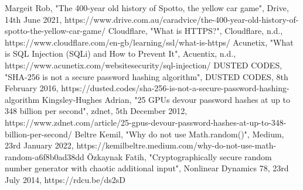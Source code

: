 \documentclass[]{final_report}
\begin{document}
\newpage
\begin{thebibliography}{99}
 Margeit Rob, "The 400-year old history of Spotto, the yellow car game", Drive, 14th June 2021, https://www.drive.com.au/caradvice/the-400-year-old-history-of-spotto-the-yellow-car-game/ 
 Cloudflare, "What is HTTPS?", Cloudflare, n.d., https://www.cloudflare.com/en-gb/learning/ssl/what-is-https/
 Acunetix, "What is SQL Injection (SQLi) and How to Prevent It", Acuentix, n.d., https://www.acunetix.com/websitesecurity/sql-injection/
 DUSTED CODES, "SHA-256 is not a secure password hashing algorithm", DUSTED CODES, 8th February 2016, https://dusted.codes/sha-256-is-not-a-secure-password-hashing-algorithm
 Kingsley-Hughes Adrian, "25 GPUs devour password hashes at up to 348 billion per second", zdnet, 5th December 2012, https://www.zdnet.com/article/25-gpus-devour-password-hashes-at-up-to-348-billion-per-second/
 Beltre Kemil, "Why do not use Math.random()", Medium, 23rd January 2022, https://kemilbeltre.medium.com/why-do-not-use-math-random-a6f8b0ad38dd
 Özkaynak Fatih, "Cryptographically secure random number generator with chaotic additional input", Nonlinear Dynamics 78, 23rd July 2014, https://rdcu.be/ds2sD
\end{thebibliography}
\label{endpage}
\end{document}
